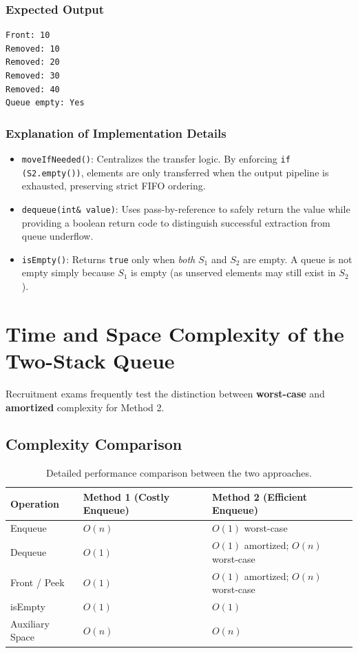 \subsubsection{Expected Output}
\begin{lstlisting}[style=pseudocode]
Front: 10
Removed: 10
Removed: 20
Removed: 30
Removed: 40
Queue empty: Yes
\end{lstlisting}

\subsubsection{Explanation of Implementation Details}
\begin{itemize}
    \item \texttt{moveIfNeeded()}: Centralizes the transfer logic. By enforcing \texttt{if (S2.empty())}, elements are only transferred when the output pipeline is exhausted, preserving strict FIFO ordering.
    \item \texttt{dequeue(int\& value)}: Uses pass-by-reference to safely return the value while providing a boolean return code to distinguish successful extraction from queue underflow.
    \item \texttt{isEmpty()}: Returns \texttt{true} only when \emph{both} $S_1$ and $S_2$ are empty. A queue is not empty simply because $S_1$ is empty (as unserved elements may still exist in $S_2$).
\end{itemize}

\section{Time and Space Complexity of the Two-Stack Queue}

Recruitment exams frequently test the distinction between \textbf{worst-case} and \textbf{amortized} complexity for Method 2.

\subsection{Complexity Comparison}

\begin{table}[htbp]
\centering
\small
\begin{tabularx}{\textwidth}{l X X}
\toprule
\textbf{Operation} & \textbf{Method 1 (Costly Enqueue)} & \textbf{Method 2 (Efficient Enqueue)} \\
\midrule
Enqueue         & $O(n)$     & $O(1)$ worst-case \\
Dequeue         & $O(1)$     & $O(1)$ amortized; $O(n)$ worst-case \\
Front / Peek    & $O(1)$     & $O(1)$ amortized; $O(n)$ worst-case \\
isEmpty         & $O(1)$     & $O(1)$ \\
Auxiliary Space & $O(n)$     & $O(n)$ \\
\bottomrule
\end{tabularx}
\caption{Detailed performance comparison between the two approaches.}
\end{table}

